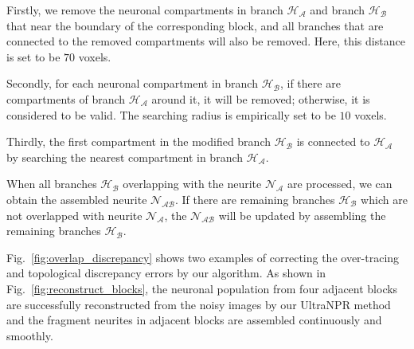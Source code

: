Firstly, we remove the neuronal compartments in branch $\mathcal{H_A}$ and branch $\mathcal{H_B}$ that near the boundary of the corresponding block, and all branches that are connected to the removed compartments will also be removed. Here, this distance is set to be $70$ voxels.

Secondly, for each neuronal compartment in branch $\mathcal{H_B}$, if there are compartments of branch $\mathcal{H_A}$ around it, it will be removed; otherwise, it is considered to be valid. The searching radius is empirically set to be $10$ voxels.


 
Thirdly, the first compartment  in the modified branch $\mathcal{H_B}$ is connected to $\mathcal{H_A}$ by searching the nearest compartment in branch $\mathcal{H_A}$. 
 
When all branches $\mathcal{H_B}$ overlapping with the neurite $\mathcal{N_A}$ are processed, we can obtain the assembled neurite $\mathcal{N_{AB}}$.
If there are remaining branches $\mathcal{H_B}$ which are not overlapped with neurite $\mathcal{N_A}$, the $\mathcal{N_{AB}}$ will be updated by assembling the remaining branches $\mathcal{H_B}$.



Fig.~\ref{fig:overlap_discrepancy} shows two examples of correcting the over-tracing and topological discrepancy errors by our algorithm.
As shown in Fig.~\ref{fig:reconstruct_blocks}, the neuronal population from four adjacent blocks are successfully reconstructed from the noisy images by our UltraNPR method and the fragment neurites in adjacent blocks are assembled continuously and smoothly.


